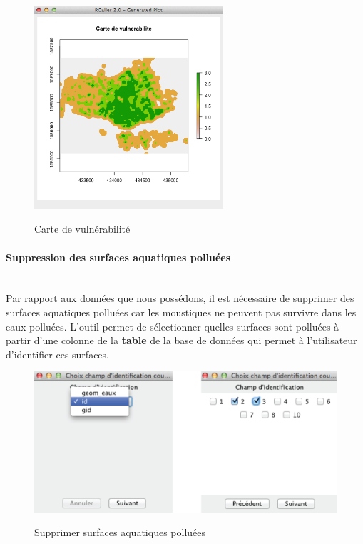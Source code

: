 \begin{figure}[H]
\begin{center}
\includegraphics[width=7cm]{Chaine7}\\
\caption{\label{Chaine7}Carte de vulnérabilité}
\end{center}
\end{figure}


\paragraph{Suppression des surfaces aquatiques polluées\\\\}

Par rapport aux données que nous possédons, il est nécessaire de supprimer des surfaces aquatiques polluées car les moustiques ne peuvent pas survivre dans les eaux polluées. L'outil permet de sélectionner quelles surfaces sont polluées à partir d'une colonne de la \textbf{table} de la base de données qui permet à l'utilisateur d'identifier ces surfaces. \\


\begin{figure}[H]
\begin{center}
\includegraphics[width=13cm]{Chaine13}\\
\caption{\label{Chaine13}Supprimer surfaces aquatiques polluées}
\end{center}
\end{figure}



